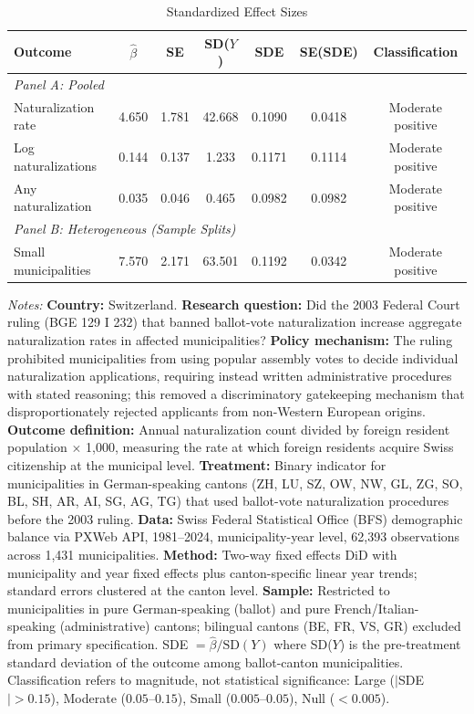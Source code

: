 \begin{table}[htbp]
\centering
\caption{Standardized Effect Sizes}
\label{tab:sde}
\begin{threeparttable}
\begin{tabular}{lcccccc}
\toprule
Outcome & $\hat{\beta}$ & SE & SD($Y$) & SDE & SE(SDE) & Classification \\
\midrule
\multicolumn{7}{l}{\textit{Panel A: Pooled}} \\[3pt]
Naturalization rate & 4.650 & 1.781 & 42.668 & 0.1090 & 0.0418 & Moderate positive \\
Log naturalizations & 0.144 & 0.137 & 1.233 & 0.1171 & 0.1114 & Moderate positive \\
Any naturalization & 0.035 & 0.046 & 0.465 & 0.0982 & 0.0982 & Moderate positive \\[6pt]
\multicolumn{7}{l}{\textit{Panel B: Heterogeneous (Sample Splits)}} \\[3pt]
Small municipalities & 7.570 & 2.171 & 63.501 & 0.1192 & 0.0342 & Moderate positive \\
\bottomrule
\end{tabular}
\begin{tablenotes}
\item \textit{Notes:} \textbf{Country:} Switzerland. \textbf{Research question:} Did the 2003 Federal Court ruling (BGE 129 I 232) that banned ballot-vote naturalization increase aggregate naturalization rates in affected municipalities? \textbf{Policy mechanism:} The ruling prohibited municipalities from using popular assembly votes to decide individual naturalization applications, requiring instead written administrative procedures with stated reasoning; this removed a discriminatory gatekeeping mechanism that disproportionately rejected applicants from non-Western European origins. \textbf{Outcome definition:} Annual naturalization count divided by foreign resident population $\times$ 1,000, measuring the rate at which foreign residents acquire Swiss citizenship at the municipal level. \textbf{Treatment:} Binary indicator for municipalities in German-speaking cantons (ZH, LU, SZ, OW, NW, GL, ZG, SO, BL, SH, AR, AI, SG, AG, TG) that used ballot-vote naturalization procedures before the 2003 ruling. \textbf{Data:} Swiss Federal Statistical Office (BFS) demographic balance via PXWeb API, 1981--2024, municipality-year level, 62,393 observations across 1,431 municipalities. \textbf{Method:} Two-way fixed effects DiD with municipality and year fixed effects plus canton-specific linear year trends; standard errors clustered at the canton level. \textbf{Sample:} Restricted to municipalities in pure German-speaking (ballot) and pure French/Italian-speaking (administrative) cantons; bilingual cantons (BE, FR, VS, GR) excluded from primary specification. SDE $= \hat{\beta} / \text{SD}(Y)$ where SD($Y$) is the pre-treatment standard deviation of the outcome among ballot-canton municipalities. Classification refers to magnitude, not statistical significance: Large ($|$SDE$| > 0.15$), Moderate ($0.05$--$0.15$), Small ($0.005$--$0.05$), Null ($< 0.005$).
\end{tablenotes}
\end{threeparttable}
\end{table}

